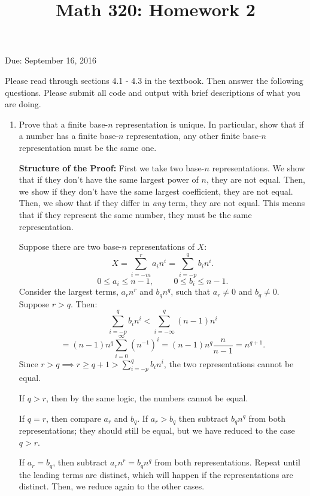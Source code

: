 \documentclass[12pt]{amsart}
\begin{document}
\title{Math 320: Homework 2}
Due: September 16, 2016
\maketitle

Please read through sections 4.1 - 4.3 in the textbook.
Then answer the following questions. Please submit all code
and output with brief descriptions of what you are doing.

\vspace{1cm}

\begin{enumerate}

\item Prove that a finite base-$n$ representation is unique.
In particular, show that if a number has a finite base-$n$ representation,
any other finite base-$n$ representation must be the same one.

\vspace{1cm}

{\bf Structure of the Proof:} First we take two base-$n$ representations.
We show that if they don't have the same largest power of $n$, they
are not equal. Then, we show if they don't have the same largest
coefficient, they are not equal. Then, we show that if they differ
in {\em any} term, they are not equal. This means that if they
represent the same number, they must be the same representation.


Suppose there are two base-$n$ representations of $X$:
\[
X = \sum_{i = -m}^{r} a_i n^i = \sum_{i = -p}^q b_i n^i. \]
\[
0 \leq a_i \leq n-1, \hspace{1cm} 0 \leq b_i \leq n-1.
\]
Consider the largest terms, $a_r n^r$ and $b_q n^q$, such that
$a_r \neq 0$ and $b_q \neq 0$. Suppose
$r > q$. Then:
\[  \sum_{i = -p}^q b_i n^i < \sum_{i=-\infty}^q (n-1) n^i \]
\[
= (n-1) n^q \sum_{i = 0}^\infty (n^{-1})^i = (n-1)n^q\dfrac{n}{n-1} = n^{q+1}.
\]
Since $r > q \implies r \geq q + 1 >  \sum_{i = -p}^q b_i n^i $, the 
two representations cannot be equal.

If $q > r$, then by the same logic, the numbers cannot be equal.

If $q = r$, then compare $a_r$ and $b_q$. If $a_r > b_q$ then subtract
$b_q n^q$ from both representations; they should still be equal, but 
we have reduced to the case $q > r$.

If $a_r = b_q$, then subtract $a_r n^r = b_q n^q$ from both representations.
Repeat until the leading terms are distinct, which will happen if the
representations are distinct. Then, we reduce again to the other cases.


\end{enumerate}
\end{document}

